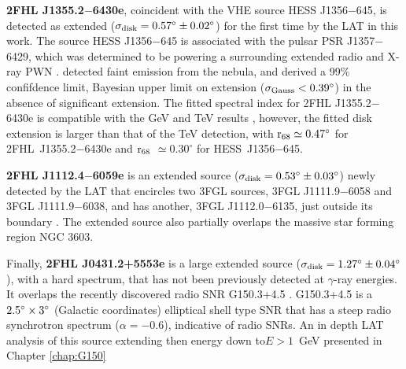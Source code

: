 {\bfseries 2FHL J1355.2$-$6430e}, coincident with the VHE source HESS J1356$-$645, is detected as extended (${\rm \sigma_{disk} =  0.57^{\circ} \pm 0.02^{\circ}}$) for the first time by the LAT in this work. The  source HESS J1356$-$645 \citep{Abramowski11} is associated with the pulsar PSR J1357$-$6429, which was determined to be powering a surrounding extended radio and X-ray PWN \citep{Lemoine-Goumard11}. \cite{Acero13} detected faint emission from the nebula, and derived a 99\% confifdence limit, Bayesian upper limit on extension (${\rm \sigma_{Gauss} < 0.39^{\circ}}$) in the absence of significant extension. The fitted spectral index for 2FHL J1355.2$-$6430e is compatible with the GeV and TeV results \citep{Acero13,Abramowski11}, however, the fitted disk extension is larger than that of the TeV detection, with ${\rm r_{68} \simeq 0.47^{\circ}}$ for 2FHL~J1355.2$-$6430e and ${\rm r_{68}}$ $\simeq 0.30^{\circ}$ for HESS~J1356$-$645.

{\bfseries 2FHL J1112.4$-$6059e} is an extended source (${\rm \sigma_{disk} =  0.53^{\circ} \pm 0.03^{\circ}}$) newly detected by the LAT that encircles two 3FGL sources, 3FGL J1111.9$-$6058 and 3FGL J1111.9$-$6038, and has another, 3FGL J1112.0$-$6135, just outside its boundary \citep{3FGL}. The extended source also partially overlaps the massive star forming region NGC 3603. %

Finally, {\bfseries 2FHL J0431.2+5553e} is a large extended source (${\rm \sigma_{disk} =  1.27^{\circ} \pm 0.04^{\circ}}$), with { a hard spectrum}, that has not been previously detected at $\gamma$-ray energies. It overlaps the recently discovered radio SNR G150.3+4.5 \citep{Gao14}. G150.3+4.5 is a ${\rm 2.5^{\circ}}\times {\rm 3^{\circ}}$ (Galactic coordinates)
elliptical shell type SNR that has a steep radio synchrotron spectrum ($\alpha = -0.6$), indicative of radio SNRs. An in depth LAT analysis of this source extending then energy down to$E > 1$~GeV  presented in Chapter \ref{chap:G150}



